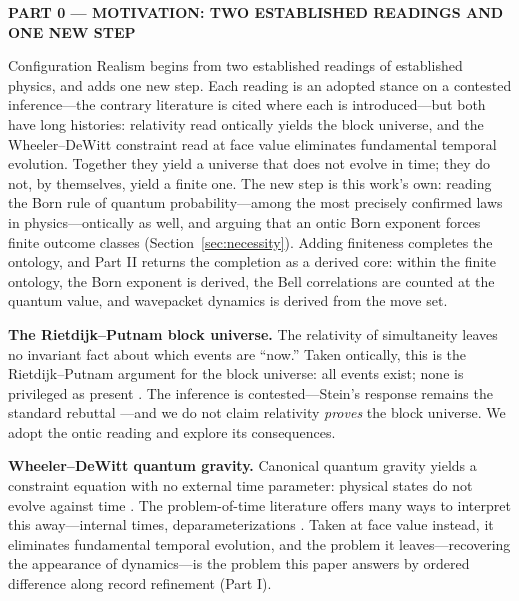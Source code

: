 \documentclass[11pt]{article}
\theoremstyle{definition}
\theoremstyle{remark}
\newcommand{\partheader}[1]{\clearpage\begin{center}{\LARGE\bfseries #1}\end{center}\vspace{1em}}
\begin{document}
\partheader{PART 0 --- MOTIVATION: TWO ESTABLISHED READINGS AND ONE NEW STEP}
Configuration Realism begins from two established readings of established physics, and adds one new step. Each reading is an adopted stance on a contested inference---the contrary literature is cited where each is introduced---but both have long histories: relativity read ontically yields the block universe, and the Wheeler--DeWitt constraint read at face value eliminates fundamental temporal evolution. Together they yield a universe that does not evolve in time; they do not, by themselves, yield a finite one. The new step is this work's own: reading the Born rule of quantum probability---among the most precisely confirmed laws in physics---ontically as well, and arguing that an ontic Born exponent forces finite outcome classes (Section~\ref{sec:necessity}). Adding finiteness completes the ontology, and Part II returns the completion as a derived core: within the finite ontology, the Born exponent is derived, the Bell correlations are counted at the quantum value, and wavepacket dynamics is derived from the move set.

\textbf{The Rietdijk--Putnam block universe.} The relativity of simultaneity leaves no invariant fact about which events are ``now.'' Taken ontically, this is the Rietdijk--Putnam argument for the block universe: all events exist; none is privileged as present \cite{Rietdijk1966,Putnam1967}. The inference is contested---Stein's response remains the standard rebuttal \cite{Stein1968}---and we do not claim relativity \emph{proves} the block universe. We adopt the ontic reading and explore its consequences.

\textbf{Wheeler--DeWitt quantum gravity.} Canonical quantum gravity yields a constraint equation with no external time parameter: physical states do not evolve against time \cite{DeWitt1967}. The problem-of-time literature offers many ways to interpret this away---internal times, deparameterizations \cite{Isham1992,Kuchar1992}. Taken at face value instead, it eliminates fundamental temporal evolution, and the problem it leaves---recovering the appearance of dynamics---is the problem this paper answers by ordered difference along record refinement (Part I).
\end{document}
